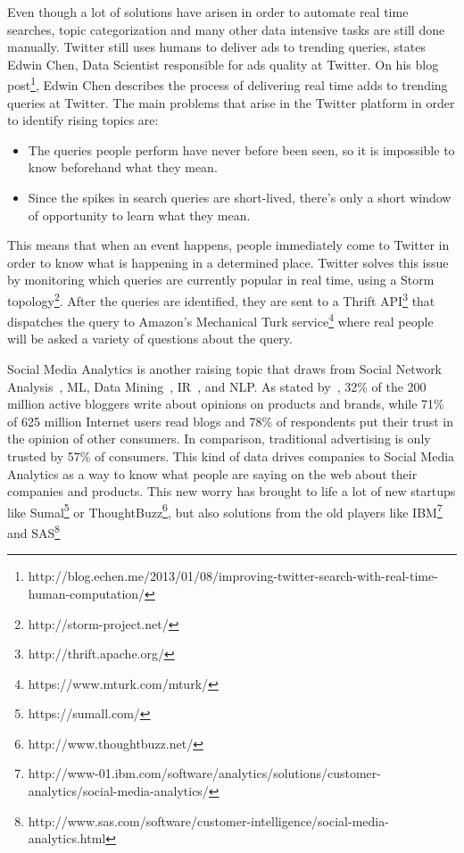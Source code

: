 Even though a lot of solutions have arisen in order to automate real time searches, topic categorization and many other data intensive tasks are still done manually. Twitter still uses humans to deliver ads to trending queries, states Edwin Chen, Data Scientist responsible for ads quality at Twitter. On his blog post\footnote{http://blog.echen.me/2013/01/08/improving-twitter-search-with-real-time-human-computation/}, Edwin Chen describes the process of delivering real time adds to trending queries at Twitter. The main problems that arise in the Twitter platform in order to identify rising topics are:
\begin{itemize}
  \item The queries people perform have never before been seen, so it is impossible to know beforehand what they mean.
  \item Since the spikes in search queries are short-lived, there's only a short window of opportunity to learn what they mean.
\end{itemize}
This means that when an event happens, people immediately come to Twitter in order to know what is happening in a determined place. Twitter solves this issue by monitoring which queries are currently popular in real time, using a Storm topology\footnote{http://storm-project.net/}. After the queries are identified, they are sent to a Thrift API\footnote{http://thrift.apache.org/} that dispatches the query to Amazon's Mechanical Turk service\footnote{https://www.mturk.com/mturk/} where real people will be asked a variety of questions about the query.

Social Media Analytics is another raising topic that draws from Social Network Analysis~\cite{knoke2008social}, \ac{ML}, Data Mining~\cite{witten2005data}, \ac{IR}~\cite{salton1983introduction}, and \ac{NLP}. As stated by~\citet{Melville2009}, 32\% of the 200 million active bloggers write about opinions on products and brands, while 71\% of 625 million Internet users read blogs and 78\% of respondents put their trust in the opinion of other consumers. In comparison, traditional advertising is only trusted by 57\% of consumers.
This kind of data drives companies to Social Media Analytics as a way to know what people are saying on the web about their companies and products. This new worry has brought to life a lot of new startups like Sumal\footnote{https://sumall.com/} or ThoughtBuzz\footnote{http://www.thoughtbuzz.net/}, but also solutions from the old players like IBM\footnote{http://www-01.ibm.com/software/analytics/solutions/customer-analytics/social-media-analytics/} and SAS\footnote{http://www.sas.com/software/customer-intelligence/social-media-analytics.html}

